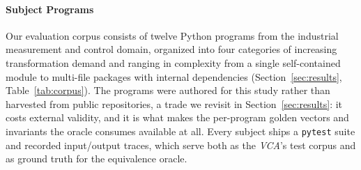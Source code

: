 \paragraph{Subject Programs}
Our evaluation corpus consists of twelve Python programs from the industrial measurement and control domain, organized into four categories of increasing transformation demand and ranging in complexity from a single self-contained module to multi-file packages with internal dependencies (Section~\ref{sec:results}, Table~\ref{tab:corpus}). The programs were authored for this study rather than harvested from public repositories, a trade we revisit in Section~\ref{sec:results}: it costs external validity, and it is what makes the per-program golden vectors and invariants the oracle consumes available at all. Every subject ships a \texttt{pytest} suite and recorded input/output traces, which serve both as the \emph{VCA}'s test corpus and as ground truth for the equivalence oracle.
